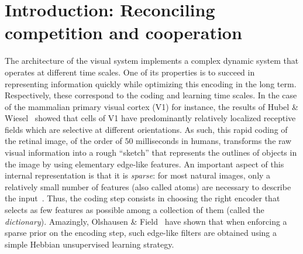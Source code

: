 \documentclass[vision,article,submit,oneauthor,pdftex]{Definitions/mdpi}
\newcommand{\seeFig}[1]{Figure~\ref{fig:#1}}%
\begin{document}
\section{Introduction: Reconciling competition and cooperation}\label{introduction}
The architecture of the visual system implements a complex dynamic system that operates at different time scales. One of its properties is to succeed in representing information quickly while optimizing this encoding in the long term. Respectively, these correspond to the coding and learning time scales. In the case of the mammalian primary visual cortex (V1) for instance, the results of Hubel \& Wiesel~\cite{Hubel68} showed that cells of V1 have predominantly relatively localized receptive fields which are selective at different orientations. As such, this rapid coding of the retinal image, of the order of $50$ milliseconds in humans, transforms the raw visual information into a rough ``sketch'' that represents the outlines of objects in the image by using elementary edge-like features. An important aspect of this internal representation is that it is \emph{sparse}: for most natural images, only a relatively small number of features (also called atoms) are necessary to describe the input~\cite{Perrinet15sparse}. Thus, the coding step consists in choosing the right encoder that selects as few features as possible among a collection of them (called the \emph{dictionary}). Amazingly, Olshausen \& Field~\cite{Olshausen96} have shown that when enforcing a sparse prior on the encoding step, such edge-like filters are obtained using a simple Hebbian unsupervised learning strategy. %
\end{document}

